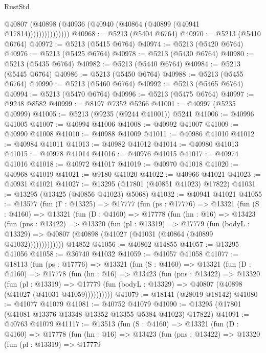 \begin{lexlean}{RustStd}
\begin{coremodule}
                    @40807 (@40898 (@40936 (@40940 (@40864 (@40899 (@40941 @17814)))))))))))))))
@40968 := @5213 (@5404 @6764)
@40970 := @5213 (@5410 @6764)
@40972 := @5213 (@5415 @6764)
@40974 := @5213 (@5420 @6764)
@40976 := @5213 (@5425 @6764)
@40978 := @5213 (@5430 @6764)
@40980 := @5213 (@5435 @6764)
@40982 := @5213 (@5440 @6764)
@40984 := @5213 (@5445 @6764)
@40986 := @5213 (@5450 @6764)
@40988 := @5213 (@5455 @6764)
@40990 := @5213 (@5460 @6764)
@40992 := @5213 (@5465 @6764)
@40994 := @5213 (@5470 @6764)
@40996 := @5213 (@5475 @6764)
@40997 := @9248 @8582
@40999 := @8197 @7352 @5266
@41001 := @40997 (@5235 @40999)
@41005 := @5213 (@9235 (@9244 @41001)) @5241
@41006 := @40996 @41005
@41007 := @40994 @41006
@41008 := @40992 @41007
@41009 := @40990 @41008
@41010 := @40988 @41009
@41011 := @40986 @41010
@41012 := @40984 @41011
@41013 := @40982 @41012
@41014 := @40980 @41013
@41015 := @40978 @41014
@41016 := @40976 @41015
@41017 := @40974 @41016
@41018 := @40972 @41017
@41019 := @40970 @41018
@41020 := @40968 @41019
@41021 := @9180 @41020
@41022 := @40966 @41021
@41023 := @40931 @41021
@41027 := @13295 (@17801 (@40851 @41023) @17822)
@41031 := @13295 (@13425 (@40856 @41023) @5068)
@41032 := @40941 @41021
@41055 := @13577
    (fun (Γ : @13325) =>
    @17777
      (fun (ps : @17776) =>
      @13321
        (fun (S : @4160) =>
        @13321
          (fun (D : @4160) =>
          @17778
            (fun (hn : @16) =>
            @13423
              (fun (pns : @13422) =>
              @13320
                (fun (pl : @13319) =>
                @17779
                  (fun (bodyL : @13329) =>
                  @40807 (@40898 (@41027 (@41031 (@40864 (@40899 @41032)))))))))))))
    @14852
@41056 := @40862 @14855
@41057 := @13295 @41056
@41058 := @36740 @41032
@41059 := @41057 @41058
@41077 := @18113
    (fun (ps : @17776) =>
    @13321
      (fun (S : @4160) =>
      @13321
        (fun (D : @4160) =>
        @17778
          (fun (hn : @16) =>
          @13423
            (fun (pns : @13422) =>
            @13320
              (fun (pl : @13319) =>
              @17779 (fun (bodyL : @13329) => @40807 (@40898 (@41027 (@41031 @41059))))))))))
@41079 := @18141 (@28019 @18142)
@41080 := @41077 @41079
@41081 := @40752 @41079
@41090 := @13295 (@17801 (@41081 @13376 @13348 @13352 @13355 @5384 @41023) @17822)
@41091 := @40763 @41079
@41117 := @13513
    (fun (S : @4160) =>
    @13321
      (fun (D : @4160) =>
      @17778
        (fun (hn : @16) =>
        @13423
          (fun (pns : @13422) =>
          @13320
            (fun (pl : @13319) =>
            @17779

\end{coremodule}
\end{lexlean}
